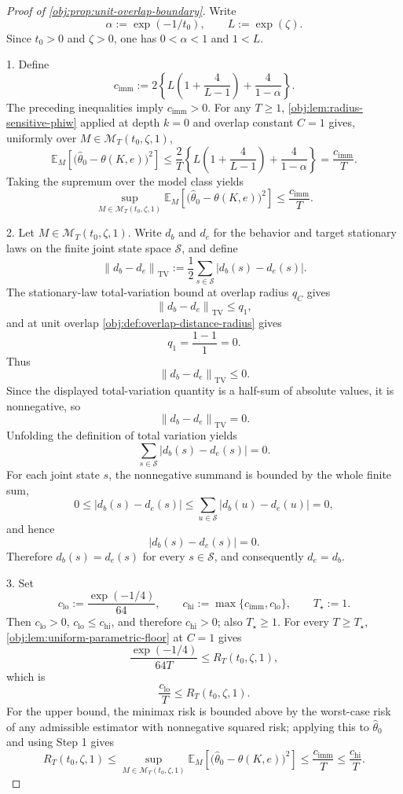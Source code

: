 \documentclass[11pt]{article}
\begin{document}
\begin{proof}[Proof of \cref{obj:prop:unit-overlap-boundary}]
Write
\[
\alpha:=\exp(-1/t_0),
\qquad
L:=\exp(\zeta).
\]
Since \(t_0>0\) and \(\zeta>0\), one has \(0<\alpha<1\) and \(1<L\). %

1. Define
\[
c_{\mathrm{imm}}
:=
2\left\{
L\left(1+\frac{4}{L-1}\right)+\frac{4}{1-\alpha}
\right\}.
\]
The preceding inequalities imply \(c_{\mathrm{imm}}>0\). For any \(T\ge1\), \cref{obj:lem:radius-sensitive-phiw} applied at depth \(k=0\) and overlap constant \(C=1\) gives, uniformly over \(M\in\mathcal M_T(t_0,\zeta,1)\),
\[
\mathbb E_M\!\left[
\bigl(\widehat\theta_0-\theta(K,e)\bigr)^2
\right]
\le
\frac{2}{T}
\left\{
L\left(1+\frac{4}{L-1}\right)+\frac{4}{1-\alpha}
\right\}
=
\frac{c_{\mathrm{imm}}}{T}.
\]
Taking the supremum over the model class yields
\[
\sup_{M\in\mathcal M_T(t_0,\zeta,1)}
\mathbb E_M\!\left[
\bigl(\widehat\theta_0-\theta(K,e)\bigr)^2
\right]
\le
\frac{c_{\mathrm{imm}}}{T}.
\]

2. Let \(M\in\mathcal M_T(t_0,\zeta,1)\). Write \(d_b\) and \(d_e\) for the behavior and target stationary laws on the finite joint state space \(\mathcal S\), and define
\[
\left\|d_b-d_e\right\|_{\mathrm{TV}}
:=
\frac12\sum_{s\in\mathcal S}|d_b(s)-d_e(s)| .
\]
The stationary-law total-variation bound at overlap radius \(q_C\) gives
\[
\left\|d_b-d_e\right\|_{\mathrm{TV}}
\le q_1,
\]
and at unit overlap \cref{obj:def:overlap-distance-radius} gives
\[
q_1=\frac{1-1}{1}=0.
\]
Thus
\[
\left\|d_b-d_e\right\|_{\mathrm{TV}}
\le0.
\]
Since the displayed total-variation quantity is a half-sum of absolute values, it is nonnegative, so
\[
\left\|d_b-d_e\right\|_{\mathrm{TV}}=0.
\]
Unfolding the definition of total variation yields
\[
\sum_{s\in\mathcal S}|d_b(s)-d_e(s)|=0.
\]
For each joint state \(s\), the nonnegative summand is bounded by the whole finite sum,
\[
0\le |d_b(s)-d_e(s)|
\le
\sum_{u\in\mathcal S}|d_b(u)-d_e(u)|
=0,
\]
and hence
\[
|d_b(s)-d_e(s)|=0.
\]
Therefore \(d_b(s)=d_e(s)\) for every \(s\in\mathcal S\), and consequently \(d_e=d_b\). %

3. Set
\[
c_{\mathrm{lo}}:=\frac{\exp(-1/4)}{64},
\qquad
c_{\mathrm{hi}}:=\max\{c_{\mathrm{imm}},c_{\mathrm{lo}}\},
\qquad
T_\star:=1.
\]
Then \(c_{\mathrm{lo}}>0\), \(c_{\mathrm{lo}}\le c_{\mathrm{hi}}\), and therefore \(c_{\mathrm{hi}}>0\); also \(T_\star\ge1\). For every \(T\ge T_\star\), \cref{obj:lem:uniform-parametric-floor} at \(C=1\) gives
\[
\frac{\exp(-1/4)}{64T}
\le
R_T(t_0,\zeta,1),
\]
which is
\[
\frac{c_{\mathrm{lo}}}{T}
\le
R_T(t_0,\zeta,1).
\]
For the upper bound, the minimax risk is bounded above by the worst-case risk of any admissible estimator with nonnegative squared risk; applying this to \(\widehat\theta_0\) and using Step 1 gives
\[
R_T(t_0,\zeta,1)
\le
\sup_{M\in\mathcal M_T(t_0,\zeta,1)}
\mathbb E_M\!\left[
\bigl(\widehat\theta_0-\theta(K,e)\bigr)^2
\right]
\le
\frac{c_{\mathrm{imm}}}{T}
\le
\frac{c_{\mathrm{hi}}}{T}.
\]


\end{proof}
\end{document}
